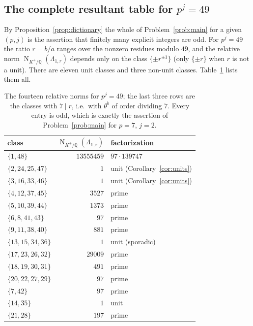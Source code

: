 \documentclass[a4paper]{article}
\newcommand{\Q}{\mathbb{Q}}
\DeclareMathOperator{\Nm}{N}
\begin{document}
\subsection{The complete resultant table for $p^j=49$}

By Proposition~\ref{prop:dictionary} the whole of Problem~\ref{prob:main}
for a given $(p,j)$ is the assertion that finitely many explicit integers
are odd.
For $p^j=49$ the ratio $r=b/a$ ranges over the nonzero residues modulo
$49$, and the relative norm $\Nm_{K^{+}/\Q}(\Lambda_{1,r})$ depends only on
the class $\{\pm r^{\pm1}\}$ (only $\{\pm r\}$ when $r$ is not a unit).
There are eleven unit classes and three non-unit classes.
Table~\ref{tab:res49} lists them all.

\begin{table}[h]
	\centering
	\begin{tabular}{lrl}
		\toprule
		class & $\Nm_{K^{+}/\Q}(\Lambda_{1,r})$ & factorization\\
		\midrule
		$\{1,48\}$              & $13555459$ & $97\cdot139747$\\
		$\{2,24,25,47\}$        & $1$        & unit (Corollary~\ref{cor:units})\\
		$\{3,16,33,46\}$        & $1$        & unit (Corollary~\ref{cor:units})\\
		$\{4,12,37,45\}$        & $3527$     & prime\\
		$\{5,10,39,44\}$        & $1373$     & prime\\
		$\{6,8,41,43\}$         & $97$       & prime\\
		$\{9,11,38,40\}$        & $881$      & prime\\
		$\{13,15,34,36\}$       & $1$        & unit (sporadic)\\
		$\{17,23,26,32\}$       & $29009$    & prime\\
		$\{18,19,30,31\}$       & $491$      & prime\\
		$\{20,22,27,29\}$       & $97$       & prime\\
		\midrule
		$\{7,42\}$              & $97$       & prime\\
		$\{14,35\}$             & $1$        & unit\\
		$\{21,28\}$             & $197$      & prime\\
		\bottomrule
	\end{tabular}
	\caption{The fourteen relative norms for $p^j=49$; the last three rows
	are the classes with $7\mid r$, i.e.\ with $\theta^{b}$ of order
	dividing $7$.
	Every entry is odd, which is exactly the assertion of
	Problem~\ref{prob:main} for $p=7$, $j=2$.}
	\label{tab:res49}
\end{table}
\end{document}
